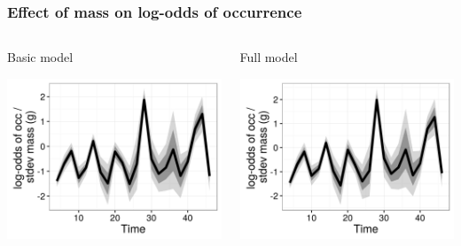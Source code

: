\documentclass{beamer}
\begin{document}
\begin{frame}
  \frametitle{Effect of mass on log-odds of occurrence}

  \begin{columns}
    \begin{column}{0.5\textwidth}
      Basic model
      \vspace*{0.05\textheight}

      \includegraphics[height=\textheight,width=\textwidth,keepaspectratio=true]{figure/mass_eff_basic}
    \end{column}
    \begin{column}{0.5\textwidth}
      Full model
      \vspace*{0.05\textheight}

      \includegraphics[height=\textheight,width=\textwidth,keepaspectratio=true]{figure/mass_eff_full}
    \end{column}
  \end{columns}
\end{frame}
\end{document}
